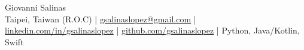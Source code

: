 \iftrue
\begin{center}
{\nameheading \Huge Giovanni Salinas}\\
\noindent
{\thinspace \thinspace \faMapMarker* Taipei, Taiwan (R.O.C)} |
\href{mailto:gsalinaslopez@gmail.com}{
    {\faEnvelope \thinspace \thinspace gsalinaslopez@gmail.com}} |
{\thinspace {}}\\
\href{https://www.linkedin.com/in/gsalinaslopez}{
    {\faLinkedin \thinspace linkedin.com/in/gsalinaslopez}} |
\href{https://github.com/gsalinaslopez}{
    {\faGithub \thinspace github.com/gsalinaslopez}} |
{\verythinspace \faLaptop \thinspace Python, Java/Kotlin, Swift}
\end{center}
\fi
